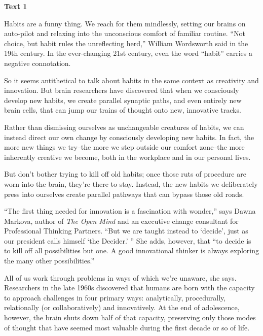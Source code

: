 
\begin{center}\textbf{Text 1}\end{center}

\qquad Habits are a funny thing. We reach for them mindlessly, setting our brains on auto-pilot and relaxing into the unconscious comfort of familiar routine. ``Not choice, but habit rules the unreflecting herd,'' William Wordsworth said in the 19th century. In the ever-changing 21st century, even the word ``habit'' carries a negative connotation.

\qquad So it seems antithetical to talk about habits in the same context as creativity and innovation. But brain researchers have discovered that when we consciously develop new habits, we create parallel synaptic paths, and even entirely new brain cells, that can jump our trains of thought onto new, innovative tracks.

\qquad Rather than dismissing ourselves as unchangeable creatures of habits, we can instead direct our own change by consciously developing new habits. In fact, the more new things we try--the more we step outside our comfort zone--the more inherently creative we become, both in the workplace and in our personal lives.

\qquad But don't bother trying to kill off old habits; once those ruts of procedure are worn into the brain, they're there to stay. Instead, the new habits we deliberately press into ourselves create parallel pathways that can bypass those old roads.

\qquad ``The first thing needed for innovation is a fascination with wonder,'' says Dawna Markova, author of \emph{The Open Mind} and an executive change consultant for Professional Thinking Partners. ``But we are taught instead to `decide', just as our president calls himself `the Decider.' '' She adds, however, that ``to decide is to kill off all possibilities but one. A good innovational thinker is always exploring the many other possibilities.''

\qquad All of us work through problems in ways of which we're unaware, she says. Researchers in the late 1960s discovered that humans are born with the capacity to approach challenges in four primary ways: analytically, procedurally, relationally (or collaboratively) and innovatively. At the end of adolescence, however, the brain shuts down half of that capacity, preserving only those modes of thought that have seemed most valuable during the first decade or so of life.

